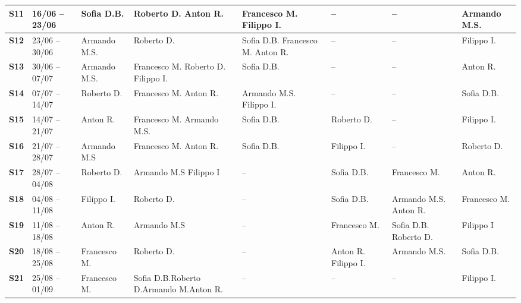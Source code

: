 \begin{longtable}{|cp{1.7cm}|p{1.7cm}|p{1.7cm}|p{1.7cm}|p{1.7cm}|p{1.7cm}|p{1.7cm}|}
    \hline
    \textbf{S11} & 16/06 -- 23/06 & Sofia D.B. & Roberto D. \newline Anton R. & Francesco M. \newline  Filippo I. & -- & -- & Armando M.S. \\
    \hline
    \textbf{S12} & 23/06 -- 30/06 & Armando M.S. & Roberto D. & Sofia D.B. \newline Francesco M. \newline Anton R. & -- & -- & Filippo I. \\
    \hline
    \textbf{S13} & 30/06 -- 07/07 & Armando M.S. & Francesco M. \newline Roberto D. \newline Filippo I. & Sofia D.B. & -- & -- & Anton R. \\
    \hline
    \textbf{S14} & 07/07 -- 14/07 & Roberto D. & Francesco M. \newline Anton R. & Armando M.S. \newline Filippo I. & -- & -- & Sofia D.B. \\
    \hline
    \textbf{S15} & 14/07 -- 21/07 & Anton R. & Francesco M. \newline Armando M.S.  & Sofia D.B. & Roberto D. & -- & Filippo I.\\
    \hline
    \textbf{S16} & 21/07 -- 28/07 & Armando M.S & Francesco M. \newline Anton R.  & Sofia D.B. & Filippo I. & -- & Roberto D.\\
    \hline
    \textbf{S17} & 28/07 -- 04/08 & Roberto D. & Armando M.S \newline Filippo I  & -- & Sofia D.B. & Francesco M. & Anton R. \\
    \hline
    \textbf{S18} & 04/08 -- 11/08 & Filippo I. & Roberto D. & -- & Sofia D.B. & Armando M.S. \newline Anton R. & Francesco M. \\
    \hline
    \textbf{S19} & 11/08 -- 18/08 & Anton R. & Armando M.S & -- & Francesco M. & Sofia D.B. \newline Roberto D. & Filippo I \\
    \hline
    \textbf{S20} & 18/08 -- 25/08 & Francesco M. & Roberto D. & -- & Anton R. \newline Filippo I. & Armando M.S. & Sofia D.B. \\
    \hline
    \textbf{S21} & 25/08 -- 01/09 & Francesco M. & Sofia D.B.\newline Roberto D.\newline Armando M.\newline Anton R. & -- & -- & -- & Filippo I. \\
\end{longtable}

